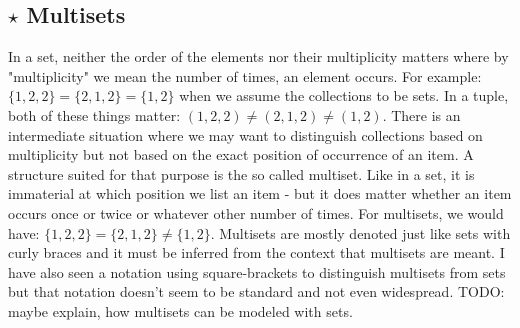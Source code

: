 



\subsection{$\star$ Multisets}
In a set, neither the order of the elements nor their multiplicity matters where by "multiplicity" we mean the number of times, an element occurs. For example: $\{ 1,2,2 \} = \{ 2,1,2 \} = \{ 1,2 \}$ when we assume the collections to be sets. In a tuple, both of these things matter: $(1,2,2) \neq (2,1,2) \neq (1,2)$. There is an intermediate situation where we may want to distinguish collections based on multiplicity but not based on the exact position of occurrence of an item. A structure suited for that purpose is the so called multiset. Like in a set, it is immaterial at which position we list an item - but it does matter whether an item occurs once or twice or whatever other number of times. For multisets, we would have: $\{ 1,2,2 \} = \{ 2,1,2 \} \neq \{ 1,2 \}$. Multisets are mostly denoted just like sets with curly braces and it must be inferred from the context that multisets are meant. I have also seen a notation using square-brackets to distinguish multisets from sets but that notation doesn't seem to be standard and not even widespread. TODO: maybe explain, how multisets can be modeled with sets.




